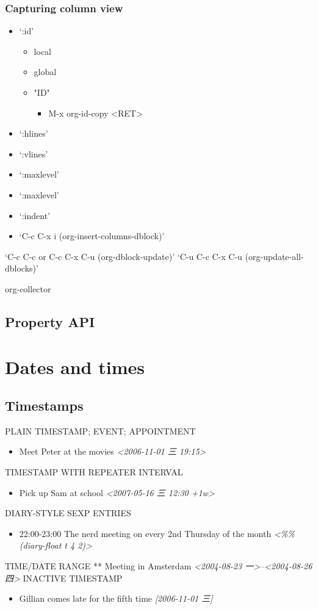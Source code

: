 \documentclass[11pt]{article}
\begin{document}
\subsubsection{Capturing column view}
\label{sec:orgfeeef3e}
\begin{itemize}
\item ‘:id’
\begin{itemize}
\item local
\item global
\item "ID"
\begin{itemize}
\item M-x org-id-copy <RET>
\end{itemize}
\end{itemize}
\item ‘:hlines’
\item ‘:vlines’
\item ‘:maxlevel’
\item ‘:maxlevel’
\item ‘:indent’

\item ‘C-c C-x i     (org-insert-columns-dblock)’
\end{itemize}
‘C-c C-c  or  C-c C-x C-u     (org-dblock-update)’
‘C-u C-c C-x C-u     (org-update-all-dblocks)’

org-collector
\subsection{Property API}
\label{sec:orgc9fa218}

\section{Dates and times}
\label{sec:orge6723d6}
\subsection{Timestamps}
\label{sec:org3d32a52}
PLAIN TIMESTAMP; EVENT; APPOINTMENT
\begin{itemize}
\item Meet Peter at the movies
\textit{<2006-11-01 三 19:15>}
\end{itemize}
TIMESTAMP WITH REPEATER INTERVAL
\begin{itemize}
\item Pick up Sam at school
\textit{<2007-05-16 三 12:30 +1w>}
\end{itemize}
DIARY-STYLE SEXP ENTRIES
\begin{itemize}
\item 22:00-23:00 The nerd meeting on every 2nd Thursday of the month
\textit{<\%\%(diary-float t 4 2)>}
\end{itemize}
TIME/DATE RANGE
          ** Meeting in Amsterdam
             \textit{<2004-08-23 一>--<2004-08-26 四>}
INACTIVE TIMESTAMP
\begin{itemize}
\item Gillian comes late for the fifth time
\textit{[2006-11-01 三]}
\end{itemize}
\end{document}
